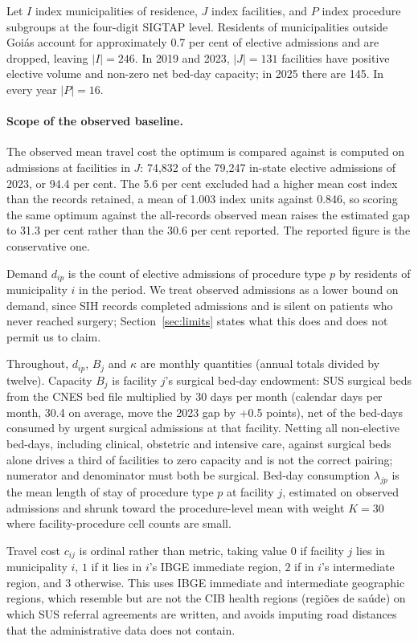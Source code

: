 Let $I$ index municipalities of residence, $J$ index facilities, and $P$ index
procedure subgroups at the four-digit SIGTAP level. Residents of municipalities
outside Goi\'as account for approximately 0.7 per cent of elective admissions and
are dropped, leaving $|I| = 246$. In 2019 and 2023, $|J| = 131$ facilities have
positive elective volume and non-zero net bed-day capacity; in 2025 there are
145. In every year $|P| = 16$.

\paragraph{Scope of the observed baseline.} The observed mean travel cost the
optimum is compared against is computed on admissions at facilities in $J$:
74{,}832 of the 79{,}247 in-state elective admissions of 2023, or 94.4 per cent.
The 5.6 per cent excluded had a higher mean cost index than the records retained, a mean of
1.003 index units against 0.846, so scoring the same optimum against the
all-records observed mean raises the estimated gap to 31.3 per cent rather than
the 30.6 per cent reported. The reported figure is the conservative one.

Demand $d_{ip}$ is the count of elective admissions of procedure type $p$ by
residents of municipality $i$ in the period. We treat observed admissions as a
lower bound on demand, since SIH records completed admissions and is silent on
patients who never reached surgery; Section~\ref{sec:limits} states what this
does and does not permit us to claim.

Throughout, $d_{ip}$, $B_j$ and $\kappa$ are monthly quantities (annual totals divided by twelve). Capacity $B_j$ is facility $j$'s surgical bed-day endowment: SUS surgical beds
from the CNES bed file multiplied by 30 days per month (calendar days per month, 30.4 on average, move the 2023 gap by +0.5 points), net of the bed-days
consumed by urgent surgical admissions at that facility. Netting all
non-elective bed-days, including clinical, obstetric and intensive care, against
surgical beds alone drives a third of facilities to zero capacity and is not the
correct pairing; numerator and denominator must both be surgical. Bed-day
consumption $\lambda_{jp}$ is the mean length of stay of procedure type $p$ at
facility $j$, estimated on observed admissions and shrunk toward the
procedure-level mean with weight $K=30$ where facility-procedure cell counts are
small.

Travel cost $c_{ij}$ is ordinal rather than metric, taking value $0$ if facility
$j$ lies in municipality $i$, $1$ if it lies in $i$'s IBGE immediate region,
$2$ if in $i$'s intermediate region, and $3$ otherwise. This uses IBGE immediate and intermediate geographic regions, which resemble but are not the CIB health regions (regi\~oes de sa\'ude) on which SUS referral agreements are written, and avoids
imputing road distances that the administrative data does not contain.

